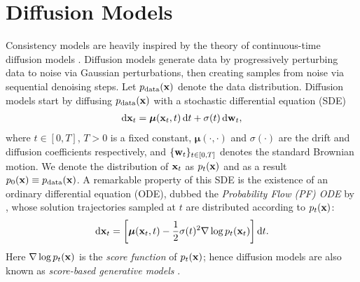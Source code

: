\section{Diffusion Models}\label{sec:diffusion}
Consistency models are heavily inspired by the theory of continuous-time diffusion models \citep{song2021scorebased,karras2022edm}. Diffusion models generate data by progressively perturbing data to noise via Gaussian perturbations, then creating samples from noise via sequential denoising steps. Let $p_\text{data}({\mathbf{x}})$ denote the data distribution. Diffusion models start by diffusing $p_\text{data}({\mathbf{x}})$ with a stochastic differential equation (SDE) \citep{song2021scorebased}
\begin{align}
    \mathop{}\!\mathrm{d} {\mathbf{x}}_t = \bm{\mu}({\mathbf{x}}_t, t) \mathop{}\!\mathrm{d} t + \sigma(t)\mathop{}\!\mathrm{d} {\mathbf{w}}_t,\label{eq:sde}
\end{align}
where $t\in[0, T]$, $T>0$ is a fixed constant, $\bm{\mu}(\cdot, \cdot)$ and $\sigma(\cdot)$ are the drift and diffusion coefficients respectively, and $\{{\mathbf{w}}_t\}_{t\in[0,T]}$ denotes the standard Brownian motion. We denote the distribution of ${\mathbf{x}}_t$ as $p_t({\mathbf{x}})$ and as a result $p_0({\mathbf{x}}) \equiv p_\text{data}({\mathbf{x}})$. A remarkable property of this SDE is the existence of
an ordinary differential equation (ODE), dubbed the \emph{Probability Flow (PF) ODE} by \citet{song2021scorebased}, whose solution trajectories sampled at $t$ are distributed according to $p_t({\mathbf{x}})$:
\begin{align}
    \mathop{}\!\mathrm{d} {\mathbf{x}}_t = \left[\bm{\mu}({\mathbf{x}}_t, t) - \frac{1}{2} \sigma(t)^2 \nabla \log p_t({\mathbf{x}}_t)\right] \mathop{}\!\mathrm{d} t. \label{eq:pfode}
\end{align}
Here $\nabla \log p_t({\mathbf{x}})$ is the \emph{score function} of $p_t({\mathbf{x}})$; hence diffusion models are also known as \emph{score-based generative models} \citep{song2019generative,song2020improved,song2021scorebased}.

